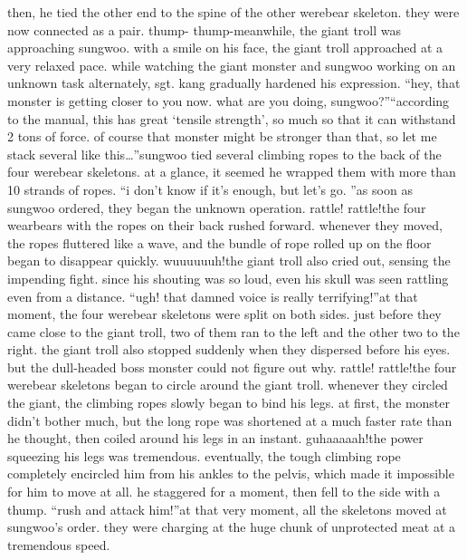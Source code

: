  then, he tied the other end to the spine of the other werebear skeleton.
 they were now connected as a pair.
thump- thump-meanwhile, the giant troll was approaching sungwoo.
 with a smile on his face, the giant troll approached at a very relaxed pace.
while watching the giant monster and sungwoo working on an unknown task alternately, sgt.
 kang gradually hardened his expression.
“hey, that monster is getting closer to you now.
 what are you doing, sungwoo?”“according to the manual, this has great ‘tensile strength’, so much so that it can withstand 2 tons of force.
 of course that monster might be stronger than that, so let me stack several like this…”sungwoo tied several climbing ropes to the back of the four werebear skeletons.
at a glance, it seemed he wrapped them with more than 10 strands of ropes.
“i don’t know if it’s enough, but let’s go.
”as soon as sungwoo ordered, they began the unknown operation.
rattle! rattle!the four wearbears with the ropes on their back rushed forward.
 whenever they moved, the ropes fluttered like a wave, and the bundle of rope rolled up on the floor began to disappear quickly.
wuuuuuuh!the giant troll also cried out, sensing the impending fight.
 since his shouting was so loud, even his skull was seen rattling even from a distance.
“ugh! that damned voice is really terrifying!”at that moment, the four werebear skeletons were split on both sides.
 just before they came close to the giant troll, two of them ran to the left and the other two to the right.
the giant troll also stopped suddenly when they dispersed before his eyes.
but the dull-headed boss monster could not figure out why.
rattle! rattle!the four werebear skeletons began to circle around the giant troll.
whenever they circled the giant, the climbing ropes slowly began to bind his legs.
at first, the monster didn’t bother much, but the long rope was shortened at a much faster rate than he thought, then coiled around his legs in an instant.
guhaaaaah!the power squeezing his legs was tremendous.
 eventually, the tough climbing rope completely encircled him from his ankles to the pelvis, which made it impossible for him to move at all.
 he staggered for a moment, then fell to the side with a thump.
“rush and attack him!”at that very moment, all the skeletons moved at sungwoo’s order.
 they were charging at the huge chunk of unprotected meat at a tremendous speed.


